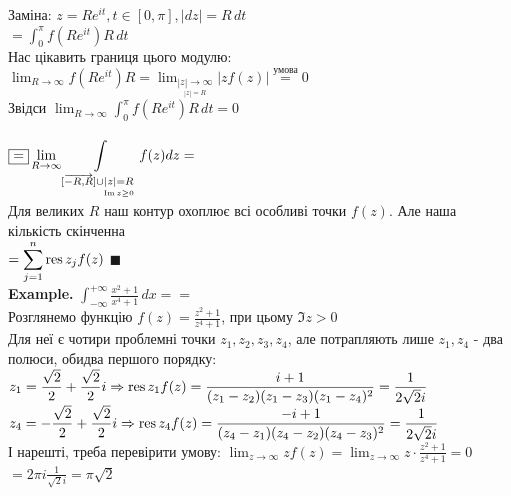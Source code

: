 \documentclass{math_library}
\begin{document}
Заміна: $z = Re^{it}, t \in [0, \pi], |dz| = R\,dt$\\
$\displaystyle = \int_0^\pi f(Re^{it}) R\,dt$\\
Нас цікавить границя цього модулю:\\
$\displaystyle \lim_{R \to \infty} f(Re^{it})R = \lim_{\underset{|z|=R}{|z| \to \infty}} |z f(z)| \overset{\textrm{умова}}{=} 0$\\
Звідси $\displaystyle \lim_{R \to \infty} \int_0^\pi f(Re^{it}) R\,dt = 0$\\
\\
$\displaystyle \boxed{=}  \lim_{R \to \infty} \int\displaylimits_{[\overrightarrow{-R,R}] \cup \underset{\Im z \geq 0}{|z|=R}} f(z)dz = $\\
Для великих $R$ наш контур охоплює всі особливі точки $f(z)$. Але наша кількість скінченна\\
$\displaystyle = \sum_{j=1}^n \operatorname*{res}{z_j}{f(z)}$ $\blacksquare$
\bigskip \\

\textbf{Example.} $\displaystyle \int_{-\infty}^{+\infty} \frac{x^2+1}{x^4+1}\,dx = \boxed{=}$\\
Розглянемо функцію $\displaystyle f(z) = \frac{z^2+1}{z^4+1}$, при цьому $\Im z > 0$\\
Для неї є чотири проблемні точки $z_1, z_2, z_3, z_4$, але потрапляють лише $z_1, z_4$ - два полюси, обидва першого порядку:\\
$\displaystyle z_1 = \frac{\sqrt{2}}{2} + \frac{\sqrt{2}}{2} i \Rightarrow \operatorname*{res}{z_1}{f(z)} = \frac{i+1}{(z_1-z_2)(z_1-z_3)(z_1-z_4)^2} = \frac{1}{2 \sqrt{2} i}$\\
$\displaystyle z_4 = -\frac{\sqrt{2}}{2} + \frac{\sqrt{2}}{2} i \Rightarrow \operatorname*{res}{z_4}{f(z)} = \frac{-i+1}{(z_4-z_1)(z_4-z_2)(z_4-z_3)^2} = \frac{1}{2 \sqrt{2} i}$\\
І нарешті, треба перевірити умову: $\displaystyle \lim_{z \to \infty} z f(z) = \lim_{z \to \infty} z \cdot \frac{z^2+1}{z^4+1} = 0$\\
$\displaystyle \boxed{=} 2 \pi i \frac{1}{\sqrt{2} i } = \pi \sqrt{2}$
\bigskip \\
\end{document}
